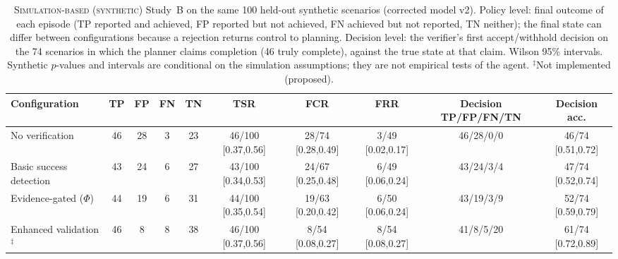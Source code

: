 \begin{table}[t]
\centering
\caption{\textsc{Simulation-based (synthetic)} Study~B on the same 100 held-out synthetic scenarios (corrected model v2). Policy level: final outcome of each episode (TP reported and achieved, FP reported but not achieved, FN achieved but not reported, TN neither); the final state can differ between configurations because a rejection returns control to planning. Decision level: the verifier's first accept/withhold decision on the 74 scenarios in which the planner claims completion (46 truly complete), against the true state at that claim. Wilson 95\% intervals. Synthetic $p$-values and intervals are conditional on the simulation assumptions; they are not empirical tests of the agent. $^{\ddagger}$Not implemented (proposed).}
\label{tab:sim-baseline}
\footnotesize
\setlength{\tabcolsep}{4pt}
\begin{tabular}{@{}lccccccccc@{}}
\toprule
Configuration & TP & FP & FN & TN & TSR & FCR & FRR & Decision TP/FP/FN/TN & Decision acc. \\
\midrule
No verification & 46 & 28 & 3 & 23 & 46/100 [0.37,0.56] & 28/74 [0.28,0.49] & 3/49 [0.02,0.17] & 46/28/0/0 & 46/74 [0.51,0.72] \\
Basic success detection & 43 & 24 & 6 & 27 & 43/100 [0.34,0.53] & 24/67 [0.25,0.48] & 6/49 [0.06,0.24] & 43/24/3/4 & 47/74 [0.52,0.74] \\
Evidence-gated ($\Phi$) & 44 & 19 & 6 & 31 & 44/100 [0.35,0.54] & 19/63 [0.20,0.42] & 6/50 [0.06,0.24] & 43/19/3/9 & 52/74 [0.59,0.79] \\
Enhanced validation$^{\ddagger}$ & 46 & 8 & 8 & 38 & 46/100 [0.37,0.56] & 8/54 [0.08,0.27] & 8/54 [0.08,0.27] & 41/8/5/20 & 61/74 [0.72,0.89] \\
\bottomrule
\end{tabular}
\end{table}
